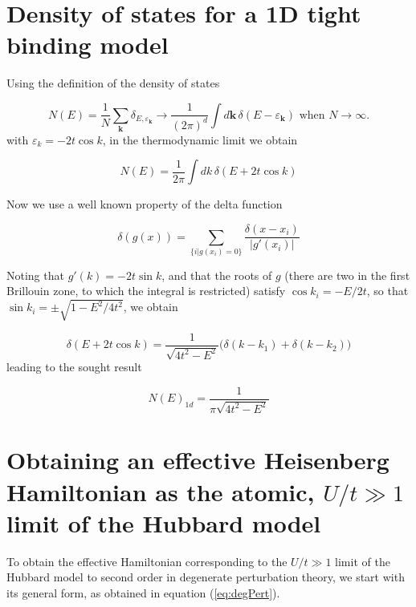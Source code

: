 \section{Density of states for a 1D tight binding model}
\label{sec:dos1d}

Using the definition of the density of states

\begin{equation}
N ( E ) = \frac{1}{N} \sum_{\bm k} \delta_{E,\varepsilon_{\bm k}} \rightarrow \frac{1}{(2\pi)^d} \int d\bm k \, \delta ( E - \varepsilon_{\bm k})\,\, \text{when}\,\, N\rightarrow \infty.
\end{equation}
with $\varepsilon_k = - 2 t \cos k$, in the thermodynamic limit we obtain

\begin{equation}
N ( E ) = \frac{1}{2\pi} \int d k \, \delta ( E + 2t \cos k)
\end{equation}

Now we use a well known property of the delta function

\begin{equation}
\delta ( g(x) ) = \sum_{ \{i | g(x_i) = 0\} } \frac{\delta ( x - x_i) }{| g' ( x_i) |}
\end{equation}

Noting that $g'(k) = - 2 t \sin k$, and that the roots of $g$ (there are two in the first Brillouin zone, to which the integral is restricted) satisfy $\cos k_i = - E / 2t$, so that $\sin k_i = \pm \sqrt{1 - E^2 / 4 t^2}$, we obtain

\begin{equation}
\delta ( E + 2 t \cos k) = \frac{1 }{ \sqrt{4t^2 - E^2 }} \bigg( \delta ( k - k_1 ) + \delta ( k - k_2 ) \bigg)
\end{equation}
leading to the sought result

\begin{equation}
N ( E )_{1d} = \frac{1}{\pi \sqrt{4 t^2 - E^2}}
\end{equation}

\section{Obtaining an effective Heisenberg Hamiltonian as the atomic,  $U/t \gg 1$ limit of the Hubbard model}
\label{sec:heisenberg}

To obtain the effective Hamiltonian corresponding to the $U/t \gg 1$ limit of the Hubbard model to second order in degenerate perturbation theory, we start with its general form, as obtained in equation (\ref{eq:degPert}).

